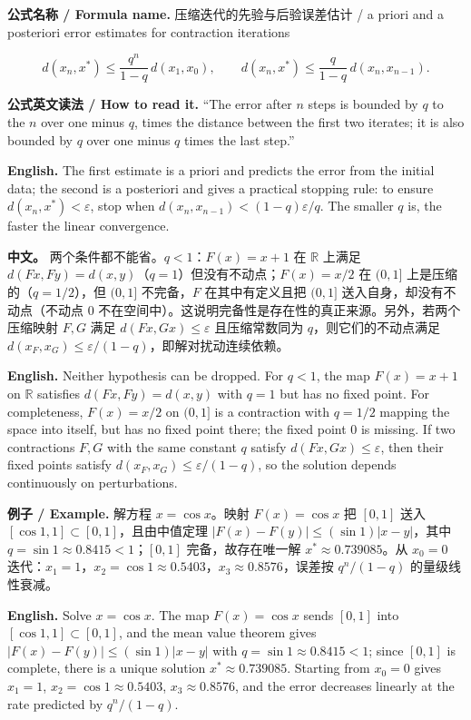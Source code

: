 \documentclass[UTF8,11pt,a4paper]{ctexart}
\newcommand{\EN}[1]{\par\noindent \textbf{English.} #1\par}
\newcommand{\READ}[1]{\par\noindent \textbf{公式英文读法 / How to read it.} #1\par}
\newcommand{\FORMULA}[2]{\par\noindent\textbf{公式名称 / Formula name.} #1 / #2\par}
\newcommand{\EX}[2]{\par\noindent \textbf{例子 / Example.} #1\par\EN{#2}}
\newcommand{\APS}[2]{\par\noindent\textbf{中文。} #1\par\noindent\textbf{English.} #2\par\smallskip}
\begin{document}
\FORMULA{压缩迭代的先验与后验误差估计}{a priori and a posteriori error estimates for contraction iterations}
\[
d(x_n,x^*)\le\frac{q^n}{1-q}\,d(x_1,x_0),
\qquad
d(x_n,x^*)\le\frac{q}{1-q}\,d(x_n,x_{n-1}).
\]
\READ{``The error after $n$ steps is bounded by $q$ to the $n$ over one minus $q$, times the distance between the first two iterates; it is also bounded by $q$ over one minus $q$ times the last step.''}
\EN{The first estimate is a priori and predicts the error from the initial data; the second is a posteriori and gives a practical stopping rule: to ensure $d(x_n,x^*)<\varepsilon$, stop when $d(x_n,x_{n-1})<(1-q)\varepsilon/q$. The smaller $q$ is, the faster the linear convergence.}

\APS{两个条件都不能省。$q<1$：$F(x)=x+1$ 在 $\mathbb R$ 上满足 $d(Fx,Fy)=d(x,y)$（$q=1$）但没有不动点；$F(x)=x/2$ 在 $(0,1]$ 上是压缩的（$q=1/2$），但 $(0,1]$ 不完备，$F$ 在其中有定义且把 $(0,1]$ 送入自身，却没有不动点（不动点 $0$ 不在空间中）。这说明完备性是存在性的真正来源。另外，若两个压缩映射 $F,G$ 满足 $d(Fx,Gx)\le\varepsilon$ 且压缩常数同为 $q$，则它们的不动点满足 $d(x_F,x_G)\le\varepsilon/(1-q)$，即解对扰动连续依赖。}{Neither hypothesis can be dropped. For $q<1$, the map $F(x)=x+1$ on $\mathbb R$ satisfies $d(Fx,Fy)=d(x,y)$ with $q=1$ but has no fixed point. For completeness, $F(x)=x/2$ on $(0,1]$ is a contraction with $q=1/2$ mapping the space into itself, but has no fixed point there; the fixed point $0$ is missing. If two contractions $F,G$ with the same constant $q$ satisfy $d(Fx,Gx)\le\varepsilon$, then their fixed points satisfy $d(x_F,x_G)\le\varepsilon/(1-q)$, so the solution depends continuously on perturbations.}

\EX{解方程 $x=\cos x$。映射 $F(x)=\cos x$ 把 $[0,1]$ 送入 $[\cos1,1]\subset[0,1]$，且由中值定理 $|F(x)-F(y)|\le(\sin1)|x-y|$，其中 $q=\sin1\approx0.8415<1$；$[0,1]$ 完备，故存在唯一解 $x^*\approx0.739085$。从 $x_0=0$ 迭代：$x_1=1$，$x_2=\cos1\approx0.5403$，$x_3\approx0.8576$，误差按 $q^n/(1-q)$ 的量级线性衰减。}{Solve $x=\cos x$. The map $F(x)=\cos x$ sends $[0,1]$ into $[\cos1,1]\subset[0,1]$, and the mean value theorem gives $|F(x)-F(y)|\le(\sin1)|x-y|$ with $q=\sin1\approx0.8415<1$; since $[0,1]$ is complete, there is a unique solution $x^*\approx0.739085$. Starting from $x_0=0$ gives $x_1=1$, $x_2=\cos1\approx0.5403$, $x_3\approx0.8576$, and the error decreases linearly at the rate predicted by $q^n/(1-q)$.}
\end{document}
